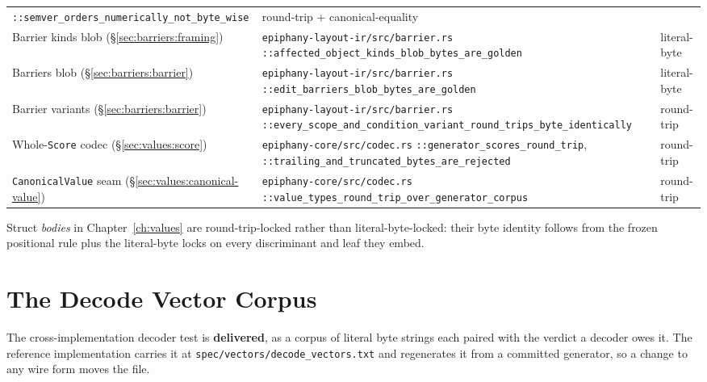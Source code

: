 \documentclass[11pt,letterpaper]{report}
\newcommand{\ub}{\_\allowbreak}
\begin{document}
\begin{longtable}{>{\raggedright\arraybackslash}p{1.5in} >{\raggedright\arraybackslash}p{3.0in} p{1.0in}}
    \texttt{::semver\ub orders\ub numerically\ub not\ub byte\ub wise} &
    round-trip + canonical-equality \\
  Barrier kinds blob (\S\ref{sec:barriers:framing}) &
    \texttt{epiphany-layout-ir/src/barrier.rs}\newline
    \texttt{::affected\ub object\ub kinds\ub blob\ub bytes\ub are\ub golden} &
    literal-byte \\
  Barriers blob (\S\ref{sec:barriers:barrier}) &
    \texttt{epiphany-layout-ir/src/barrier.rs}\newline
    \texttt{::edit\ub barriers\ub blob\ub bytes\ub are\ub golden} &
    literal-byte \\
  Barrier variants (\S\ref{sec:barriers:barrier}) &
    \texttt{epiphany-layout-ir/src/barrier.rs}\newline
    \texttt{::every\ub scope\ub and\ub condition\ub variant\ub round\ub trips\ub byte\ub identically} &
    round-trip \\
  Whole-\texttt{Score} codec (\S\ref{sec:values:score}) &
    \texttt{epiphany-core/src/codec.rs}\newline
    \texttt{::generator\ub scores\ub round\ub trip},
    \texttt{::trailing\ub and\ub truncated\ub bytes\ub are\ub rejected} &
    round-trip \\
  \texttt{CanonicalValue} seam (\S\ref{sec:values:canonical-value}) &
    \texttt{epiphany-core/src/codec.rs}\newline
    \texttt{::value\ub types\ub round\ub trip\ub over\ub generator\ub corpus} &
    round-trip \\
  \bottomrule
\end{longtable}
\endgroup

Struct \emph{bodies} in Chapter~\ref{ch:values} are round-trip-locked rather
than literal-byte-locked: their byte identity follows from the frozen
positional rule plus the literal-byte locks on every discriminant and leaf
they embed.

\section{The Decode Vector Corpus}
\label{sec:goldens:decode-vectors}

The cross-implementation decoder test is \textbf{delivered}, as a corpus of
literal byte strings each paired with the verdict a decoder owes it. The
reference implementation carries it at \texttt{spec/vectors/decode\_vectors.txt}
and regenerates it from a committed generator, so a change to any wire form
moves the file.
\end{document}
